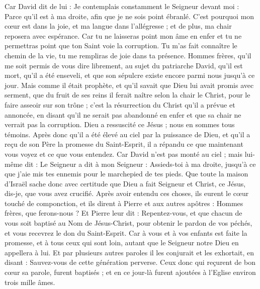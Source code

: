 \begin{multicols}{2}
Car David dit de lui : Je contemplais constamment le Seigneur devant moi : Parce qu'il est à ma droite, afin que je ne sois point ébranlé.
C'est pourquoi mon cœur est dans la joie, et ma langue dans l'allégresse ; et de plus, ma chair reposera avec espérance.
Car tu ne laisseras point mon âme en enfer et tu ne permettras point que ton Saint voie la corruption.
Tu m'as fait connaître le chemin de la vie, tu me rempliras de joie dans ta présence.
Hommes frères, qu'il me soit permis de vous dire librement, au sujet du patriarche David, qu'il est mort, qu'il a été enseveli, et que son sépulcre existe encore parmi nous jusqu'à ce jour.
Mais comme il était prophète, et qu'il savait que Dieu lui avait promis avec serment, que du fruit de ses reins il ferait naître selon la chair le Christ, pour le faire asseoir sur son trône ;
c'est la résurrection du Christ qu'il a prévue et annoncée, en disant qu'il ne serait pas abandonné en enfer et que sa chair ne verrait pas la corruption.
Dieu a ressuscité ce Jésus ; nous en sommes tous témoins.
Après donc qu'il a été élevé au ciel  par la puissance de Dieu, et qu'il a reçu de son Père la promesse du Saint-Esprit, il a répandu ce que maintenant vous voyez et ce que vous entendez.
Car David n'est pas monté au ciel ; mais lui-même dit : Le Seigneur a dit à mon Seigneur : Assieds-toi à ma droite,
jusqu'à ce que j'aie mis tes ennemis pour le marchepied de tes pieds. 
Que toute la maison d'Israël sache donc avec certitude que Dieu a fait Seigneur et Christ, ce Jésus, dis-je, que vous avez crucifié.
Après avoir entendu ces choses, ils eurent le cœur touché de componction, et ils dirent à Pierre et aux autres apôtres : Hommes frères, que ferons-nous ?
Et Pierre leur dit : Repentez-vous, et que chacun de vous soit baptisé au Nom de Jésus-Christ, pour obtenir le pardon de vos péchés, et vous recevrez le don du Saint-Esprit.
Car à vous et à vos enfants est faite la promesse, et à tous ceux qui sont loin, autant que le Seigneur notre Dieu en appellera à lui.
Et par plusieurs autres paroles il les conjurait et les exhortait, en disant : Sauvez-vous de cette génération perverse.
Ceux donc qui reçurent de bon cœur sa parole, furent baptisés ; et en ce jour-là furent ajoutées à l'Eglise environ trois mille âmes.

\end{multicols}
